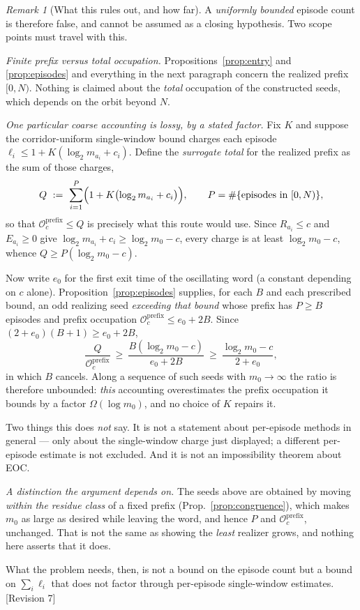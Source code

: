 \documentclass[11pt]{article}
\theoremstyle{plain}
\theoremstyle{definition}
\theoremstyle{remark}
\newtheorem{remark}[theorem]{Remark}
\newcommand{\Occ}{\mathcal{O}}
\newcommand{\status}[1]{\textsf{\footnotesize[#1]}}
\begin{document}
\begin{remark}[What this rules out, and how far]\label{rem:episodescope}
A \emph{uniformly bounded} episode count is therefore false, and cannot be assumed as a closing
hypothesis. Two scope points must travel with this.

\emph{Finite prefix versus total occupation.} Propositions~\ref{prop:entry} and
\ref{prop:episodes} and everything in the next paragraph concern the realized prefix $[0,N)$.
Nothing is claimed about the \emph{total} occupation of the constructed seeds, which depends on the
orbit beyond $N$.

\emph{One particular coarse accounting is lossy, by a stated factor.} Fix $K$ and suppose the
corridor-uniform single-window bound charges each episode $\ell_i\le1+K(\log_2m_{a_i}+c_i)$. Define
the \emph{surrogate total} for the realized prefix as the sum of those charges,
\[
Q\ :=\ \sum_{i=1}^{P}\Bigl(1+K\bigl(\log_2 m_{a_i}+c_i\bigr)\Bigr),
\qquad P=\#\{\text{episodes in }[0,N)\},
\]
so that $\Occ_c^{\mathrm{prefix}}\le Q$ is precisely what this route would use. Since
$R_{a_i}\le c$ and $E_{a_i}\ge0$ give $\log_2m_{a_i}+c_i\ge\log_2m_0-c$, every charge is at least
$\log_2m_0-c$, whence $Q\ge P(\log_2m_0-c)$.

Now write $e_0$ for the first exit time of the oscillating word (a constant depending on $c$ alone).
Proposition~\ref{prop:episodes} supplies, for each $B$ and each prescribed bound, an odd realizing
seed \emph{exceeding that bound} whose prefix has $P\ge B$ episodes and prefix occupation
$\Occ_c^{\mathrm{prefix}}\le e_0+2B$. Since $(2+e_0)(B+1)\ge e_0+2B$,
\[
\frac{Q}{\Occ_c^{\mathrm{prefix}}}\ \ge\ \frac{B(\log_2m_0-c)}{e_0+2B}\ \ge\
\frac{\log_2m_0-c}{2+e_0},
\]
in which $B$ cancels. Along a sequence of such seeds with $m_0\to\infty$ the ratio is therefore
unbounded: \emph{this} accounting overestimates the prefix occupation it bounds by a factor
$\Omega(\log m_0)$, and no choice of $K$ repairs it.

Two things this does \emph{not} say. It is not a statement about per-episode methods in general ---
only about the single-window charge just displayed; a different per-episode estimate is not
excluded. And it is not an impossibility theorem about EOC.

\emph{A distinction the argument depends on.} The seeds above are obtained by moving \emph{within
the residue class} of a fixed prefix (Prop.~\ref{prop:congruence}), which makes $m_0$ as large as
desired while leaving the word, and hence $P$ and $\Occ_c^{\mathrm{prefix}}$, unchanged. That is not
the same as showing the \emph{least} realizer grows, and nothing here asserts that it does.

What the problem needs, then, is not a bound on the episode count but a bound on $\sum_i\ell_i$
that does not factor through per-episode single-window estimates. \status{Revision 7}
\end{remark}
\end{document}
